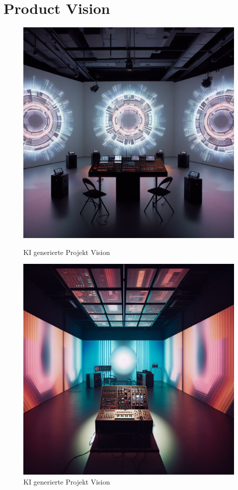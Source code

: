 \documentclass[12pt]{scrartcl}%
\theoremstyle{nonumberplain}
\begin{document}
\section{Product Vision}
\begin{figure}[h]
   \begin{minipage}[b]{.4\linewidth} %
      \includegraphics[width=\linewidth]{vision1}
      \caption{KI generierte Projekt Vision}
   \end{minipage}
   \hspace{.1\linewidth}%
   \begin{minipage}[b]{.4\linewidth} %
      \includegraphics[width=\linewidth]{vision2}
      \caption{KI generierte Projekt Vision}
   \end{minipage}
\end{figure}
\end{document}
